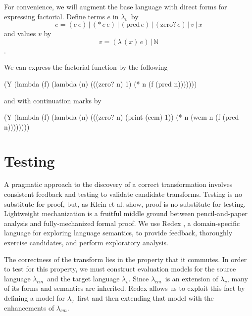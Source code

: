 \documentclass{llncs}
\newcommand{\cm}[0]{$\lambda_{cm}$}
\newcommand{\lv}[0]{$\lambda_v$}
\newcommand{\app}[2]{(#1\,#2)}
\newcommand{\abs}[2]{(\lambda\,(#1)\,#2)}
\begin{document}
For convenience, we will augment the base language with direct forms for expressing factorial. Define terms $e$ in \lv\ by
\begin{equation}
e=\app{e}{e}\,|\,(*\,e\,e)\,|\,\app{\mathrm{pred}}{e}\,|\,\app{\mathrm{zero?}}{e}\,|\,v\,|\,x
\end{equation}
and values $v$ by
\begin{equation}
v=\abs{x}{e}\,|\,\mathbb{N}
\end{equation}
.

We can express the factorial function by the following
\begin{schemedisplay}
(Y (lambda (f)
     (lambda (n)
       (((zero? n)
         1)
        (* n (f (pred n)))))))
\end{schemedisplay}

and with continuation marks by
\begin{schemedisplay}
(Y (lambda (f)
     (lambda (n)
       (((zero? n)
         (print (ccm) 1))
        (* n (wcm n (f (pred n))))))))
\end{schemedisplay}

\section{Testing}

A pragmatic approach to the discovery of a correct transformation involves consistent feedback and testing to validate candidate transforms. Testing is no substitute for proof, but, as Klein et al. \cite{klein2012run} show, proof is no substitute for testing. Lightweight mechanization is a fruitful middle ground between pencil-and-paper analysis and fully-mechanized formal proof. We use Redex \cite{findler2010redex}, a domain-specific language for exploring language semantics, to provide feedback, thoroughly exercise candidates, and perform exploratory analysis.

The correctness of the transform lies in the property that it commutes. In order to test for this property, we must construct evaluation models for the source language \cm\ and the target language \lv. Since \cm\ is an extension of \lv, many of its forms and semantics are inherited. Redex allows us to exploit this fact by defining a model for \lv\ first and then extending that model with the enhancements of \cm.

\end{document}
